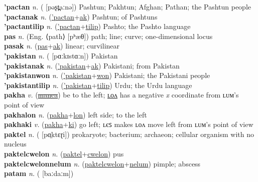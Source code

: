 \textbf{'pactan} \textit{n.} ( [pəʂt̪aːnə])
Pashtun; Pakhtun; Afghan; Pathan; the Pashtun people \label{'pactan} \\
\textbf{'pactanak} \textit{n.} (\hyperref['pactan]{'pactan}+\hyperref[ak]{ak})
Pashtun; of Pashtuns \label{'pactanak} \\
\textbf{'pactantilip} \textit{n.} (\hyperref['pactan]{'pactan}+\hyperref[tilip]{tilip})
Pashto; the Pashto language \label{'pactantilip} \\
\textbf{pas} \textit{n.} (Eng. ⟨path⟩ [pʰæθ])
path; line; curve; one-dimensional locus \label{pas} \\
\textbf{pasak} \textit{n.} (\hyperref[pas]{pas}+\hyperref[ak]{ak})
linear; curvilinear \label{pasak} \\
\textbf{'pakistan} \textit{n.} ( [pɑːkɪstɑːn])
Pakistan \label{'pakistan} \\
\textbf{'pakistanak} \textit{n.} (\hyperref['pakistan]{'pakistan}+\hyperref[ak]{ak})
Pakistani; from Pakistan \label{'pakistanak} \\
\textbf{'pakistanwon} \textit{n.} (\hyperref['pakistan]{'pakistan}+\hyperref[won]{won})
Pakistani; the Pakistani people \label{'pakistanwon} \\
\textbf{'pakistantilip} \textit{n.} (\hyperref['pakistan]{'pakistan}+\hyperref[tilip]{tilip})
Urdu; the Urdu language \label{'pakistantilip} \\
\textbf{pakha} \textit{v.} (\hyperref[manca]{\sout{manca}})
be to the left; \hyperref[pakhalon]{ʟᴏᴧ} has a negative \textit{x} coordinate from ʟᴜᴍ’s point of view \label{pakha} \\
\textbf{pakhalon} \textit{n.} (\hyperref[pakha]{pakha}+\hyperref[lon]{lon})
left side; to the left \label{pakhalon} \\
\textbf{pakhaki} \textit{v.} (\hyperref[pakha]{pakha}+\hyperref[ki]{ki})
go left; ʟєꜱ makes ʟᴏᴧ move left from ʟᴜᴍ’s point of view \label{pakhaki} \\
\textbf{paktel} \textit{n.} ( [pɑ̤ktɛɽi])
prokaryote; bacterium; archaeon; cellular organism with no nucleus \label{paktel} \\
\textbf{paktelcwelon} \textit{n.} (\hyperref[paktel]{paktel}+\hyperref[cwelon]{cwelon})
pus \label{paktelcwelon} \\
\textbf{paktelcwelonnelum} \textit{n.} (\hyperref[paktelcwelon]{paktelcwelon}+\hyperref[nelum]{nelum})
pimple; abscess \label{paktelcwelonnelum} \\
\textbf{patam} \textit{n.} ( [baːdaːm])
